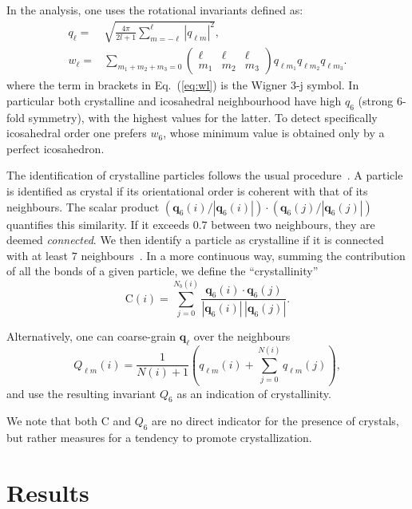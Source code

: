 \documentclass[twocolumn,superscriptaddress]{revtex4-1}
\begin{document}
In the analysis, one uses the rotational invariants defined as:
\begin{align}
	q_\ell =& \sqrt{\frac{4\pi}{2l+1} \sum_{m=-\ell}^{\ell} |q_{\ell m}|^2 }, \label{eq:ql}\\
	w_\ell =& \sum_{m_1+m_2+m_3=0} 
			\left( \begin{array}{ccc}
				\ell & \ell & \ell \\
				m_1 & m_2 & m_3 
			\end{array} \right)
			q_{\ell m_1} q_{\ell m_2} q_{\ell m_3}. \label{eq:wl}
\end{align}
where the term in brackets in Eq.~(\ref{eq:wl}) is the Wigner 3-j symbol.
In particular both crystalline and icosahedral neighbourhood have high $q_6$ (strong 6-fold symmetry), with the highest values for the latter. To detect specifically icosahedral order one prefers $w_6$, whose minimum value is obtained only by a perfect icosahedron.

The identification of crystalline particles follows the usual procedure~\cite{auer}. A particle is identified as crystal if
its orientational order is coherent with that of its neighbours.
The scalar product $(\mathbf{q}_6(i)/|\mathbf{q}_6(i)|)\cdot(\mathbf{q}_6(j)/|\mathbf{q}_6(j)|)$ quantifies this similarity. If it exceeds $0.7$ between
two neighbours, they are deemed \emph{connected}. We then identify a particle as crystalline if it is connected with at least $7$ neighbours~\cite{auer}. In a more continuous way, summing the contribution of all the bonds of a given particle, we define the ``crystallinity''~\cite{russo_hs}
\begin{equation}\label{eqn:crystallinity}
 \text{C}(i)=\sum_{j=0}^{N_b(i)}\frac{\mathbf{q}_6(i)\cdot\mathbf{q}_6(j)}{|\mathbf{q}_6(i)|\,|\mathbf{q}_6(j)|}.
\end{equation}

Alternatively, one can coarse-grain $\mathbf{q}_\ell$ over the neighbours~\cite{lechner}
\begin{equation}
	Q_{\ell m}(i) = \frac{1}{N(i)+1}\left( q_{\ell m}(i) +  \sum_{j=0}^{N(i)} q_{\ell m}(j)\right), 
	\label{eq:Qlm}
\end{equation}
and use the resulting invariant $Q_6$ as an indication of crystallinity.

We note that both $\text{C}$ and $Q_6$ are no direct indicator for the presence of crystals, but rather measures for a tendency to promote crystallization.

\section{Results}\label{sec:results}
\end{document}
